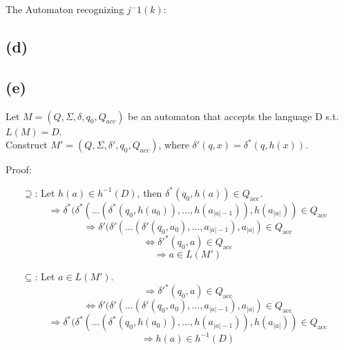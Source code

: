 The Automaton recognizing $j^-1(k)$: \\


\subsection{(d)}

\subsection{(e)}

Let $M = (Q, \Sigma, \delta, q_0, Q_{acc})$ be an automaton that accepts the language D s.t. $L(M) = D$.\\
Construct $M' = (Q, \Sigma, \delta', q_0, Q_{acc})$, where $\delta'(q,x) = \delta^*(q, h(x))$.

Proof:
\begin{itemize}
    \item[$\supseteq$:] Let \( h(a) \in h^{-1}(D) \), then \( \delta^*(q_0,h(a)) \in Q_{\text{acc}} \).
    \[
    \Rightarrow \delta^*(\delta^*(\dots(\delta^*(q_0,h(a_0)), \dots, h(a_{|a|-1})), h(a_{|a|})) \in Q_{\text{acc}}
    \]
    \[
    \Rightarrow \delta'(\delta'(\dots(\delta'(q_0, a_0), \dots, a_{|a|-1}), a_{|a|}) \in Q_{\text{acc}}
    \]
    \[
    \Leftrightarrow \delta'^*(q_0, a) \in Q_{\text{acc}}
    \]
    \[
    \Rightarrow a \in L(M')
    \]

    \item[$\subseteq$:] Let \( a \in L(M') \).
    \[
    \Rightarrow \delta'^*(q_0, a) \in Q_{\text{acc}}
    \]
    \[
    \Leftrightarrow \delta'(\delta'(\dots(\delta'(q_0, a_0), \dots, a_{|a|-1}), a_{|a|}) \in Q_{\text{acc}}
    \]
    \[
    \Rightarrow \delta^*(\delta^*(\dots(\delta^*(q_0, h(a_0)), \dots, h(a_{|a|-1})), h(a_{|a|})) \in Q_{\text{acc}}
    \]
    \[
    \Rightarrow h(a) \in h^{-1}(D)
    \]
    \qedsymbol
\end{itemize}



